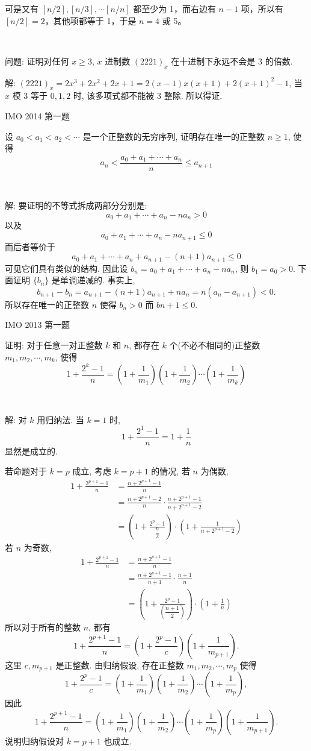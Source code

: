 可是又有 $ [n/2],[n/3],\cdots [n/n] $ 都至少为 1，而右边有 $ n-1 $ 项，所以有 $ [n/2]=2 $，其他项都等于 1，于是 $ n=4 $ 或 5。

~

问题: 证明对任何 $x\ge 3$, $x$ 进制数 $(2221)_x$ 在十进制下永远不会是 3 的倍数.

解: $(2221)_x = 2x^3+2x^2+2x+1 = 2(x-1)x(x+1)+2(x+1)^2-1$, 当 $x$ 模 3 等于 $0,1,2$ 时, 该多项式都不能被 3 整除. 所以得证.


\newpage
\noindent IMO 2014 第一题

设 $a_0 < a_1 < a_2 < \cdots$ 是一个正整数的无穷序列, 证明存在唯一的正整数 $n \ge 1$, 使得
\[ a_n < \frac{a_0+a_1+\cdots+a_n}{n} \le a_{n+1}\]

~

解: 要证明的不等式拆成两部分分别是: 
\[a_0 + a_1 + \cdots + a_n - na_n > 0 \]
以及
\[a_0 + a_1 + \cdots + a_n - na_{n+1} \le 0\]
而后者等价于 
\[a_0 + a_1 + \cdots + a_n + a_{n+1} - (n+1)a_{n+1} \le 0\]
可见它们具有类似的结构. 因此设 $b_n = a_0 + a_1 + \cdots + a_n - na_n$, 则 $b_1 = a_0 > 0$. 下面证明 $\{b_n\}$ 是单调递减的. 事实上, 
\[b_{n+1} - b_n = a_{n+1} - (n+1)a_{n+1} + na_n = n(a_n - a_{n+1}) < 0 .\]
所以存在唯一的正整数 $n$ 使得 $b_n > 0$ 而 $b{n+1} \le 0$.


\newpage
\noindent IMO 2013 第一题

证明: 对于任意一对正整数 $k$ 和 $n$, 都存在 $k$ 个(不必不相同的)正整数 $m_1, m_2, \cdots, m_k$, 使得
\[1 + \frac{2^k-1}{n} = \left(1+\frac{1}{m_1}\right)\left(1+\frac{1}{m_2}\right)\cdots\left(1+\frac{1}{m_k}\right)\]

~

解: 对 $k$ 用归纳法. 当 $k=1$ 时, 
\[1 + \frac{2^1 - 1}{n} = 1+\frac{1}{n}\]
显然是成立的.

若命题对于 $k=p$ 成立, 考虑 $k=p+1$ 的情况, 若 $n$ 为偶数,
\begin{align*}
1 + \frac{2^{p+1}-1}{n} &= \frac{n+2^{p+1}-1}{n} \\
&= \frac{n+2^{p+1}-2}{n}\cdot\frac{n+2^{p+1}-1}{n+2^{p+1}-2}\\
&= \left(1+\frac{2^p-1}{\dfrac{n}{2}}\right)\cdot\left(1+\frac{1}{n+2^{p+1}-2}\right)
\end{align*}
若 $n$ 为奇数, 
\begin{align*}
1 + \frac{2^{p+1}-1}{n}  &= \frac{n+2^{p+1}-1}{n} \\
&= \frac{n+2^{p+1}-1}{n+1}\cdot\frac{n+1}{n}\\
&= \left(1+\frac{2^p-1}{(\dfrac{n+1}{2})}\right)\cdot\left(1+\frac{1}{n}\right)
\end{align*}
所以对于所有的整数 $n$, 都有
\[1+\frac{2^{p+1}-1}{n} = \left(1+\frac{2^p-1}{c}\right)\left(1+\frac{1}{m_{p+1}}\right) .\]
这里 $c, m_{p+1}$ 是正整数. 由归纳假设, 存在正整数 $m_1,m_2,\cdots,m_p$ 使得
\[1+\frac{2^p-1}{c} = \left(1+\frac{1}{m_1}\right)\left(1+\frac{1}{m_2}\right)\cdots\left(1+\frac{1}{m_p}\right) ,\]
因此
\[1+\frac{2^{p+1}-1}{n} = \left(1+\frac{1}{m_1}\right)\left(1+\frac{1}{m_2}\right)\cdots\left(1+\frac{1}{m_p}\right)\left(1+\frac{1}{m_{p+1}}\right) .\]
说明归纳假设对 $k=p+1$ 也成立.

